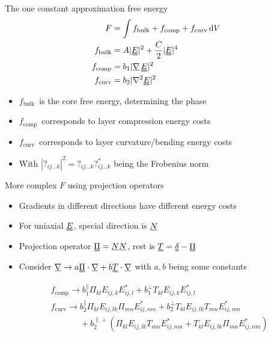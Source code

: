 \documentclass[10pt,mathserif]{beamer}
\newcommand{\suf}[2]{\stackunder[0.5pt]{\stackunder[1pt]{\ensuremath{#1}}{\rule{\widthof{\ensuremath{#2}}*\real{0.9}}{.1ex}}}{}}
\newcommand{\duf}[2]{\stackunder[0.5pt]{\stackunder[0.8pt]{\stackunder[1pt]{\ensuremath{#1}}{\rule{\widthof{\ensuremath{#2}}*\real{0.9}}{.1ex}}}{\rule{\widthof{\ensuremath{#2}}*\real{0.9}}{.1ex}}}{}}
\newcommand{\su}[1]{\suf{#1}{#1}}
\newcommand{\du}[1]{\duf{#1}{#1}}
\newcommand{\mgrad}{\ensuremath{\suf{\nabla}{K}\,}}
\newcommand{\EE}{\ensuremath{\du{E}}}
\newcommand{\FB}{\ensuremath{f_\text{bulk}}}
\newcommand{\FC}{\ensuremath{f_\text{comp}}}
\newcommand{\FU}{\ensuremath{f_\text{curv}}}
\newcommand{\onedot}{$\mathsurround0pt\ldotp$}
\newcommand{\cddot}{\mathbin{
    \vcenter{\baselineskip1ex \vspace{-0.1ex}\hbox{\onedot}\hbox{\onedot}}
}}
\newcommand{\extra}[1]{\color{gray} #1 \normalcolor}
\begin{document}
\begin{frame}[fragile]{The one constant approximation free energy}
    \newrefsection
    \begin{align*}
        F &= \int f_\text{bulk} + f_\text{comp} + f_\text{curv} \dd{V} \\
        f_\text{bulk} &= A |\EE|^2 + \frac{C}{2} |\EE|^4 \\
        f_\text{comp} &= b_1 |\mgrad \EE|^2 \\
        f_\text{curv} &= b_2 |\nabla^2 \EE|^2
    \end{align*}
    \begin{itemize}
        \item \FB\ is the core free energy, determining the phase
        \item \FC\ corresponds to layer compression energy costs
        \item \FU\ corresponds to layer curvature/bending energy costs
        \extra{\item With $|?_{ij\ldots k}|^2=?_{ij\ldots k}?_{ij\ldots k}^*$ being the Frobenius norm}
    \end{itemize}
\end{frame}

\begin{frame}[fragile]{More complex $F$ using projection operators}
    \newrefsection
    \begin{itemize}
        \item Gradients in different directions have different energy costs
        \item For uniaxial \EE, special direction is $\su{N}$
        \item Projection operator $\du{\Pi}=\su{N}\su{N}$, rest is $\du{T} = \du{\delta} - \du{\Pi}$
        \extra{\item Consider $\su{\nabla} \rightarrow a \du{\Pi}\cdot\su{\nabla} + b \du{T}\cdot\su{\nabla}$ with $a, b$ being some constants}
    \end{itemize}

    \begin{align*}
        &f_\text{comp} \rightarrow b_1^\parallel \Pi_{kl} E_{ij,k}E_{ij,l}^* + b_1^\perp T_{kl} E_{ij,k}E_{ij,l}^* \\
        &f_\text{curv} \rightarrow b_2^\parallel \Pi_{kl}E_{ij,lk}\Pi_{mn}E_{ij,nm}^* + b_2^\perp T_{kl}E_{ij,lk}T_{mn}E_{ij,nm}^* \\
        &\phantom{f_\text{curv} \rightarrow}+ b_2^{\parallel\perp}(\Pi_{kl}E_{ij,lk}T_{mn}E_{ij,nm}^* + T_{kl}E_{ij,lk}\Pi_{mn}E_{ij,nm}^*)
    \end{align*}

\end{frame}
\end{document}
